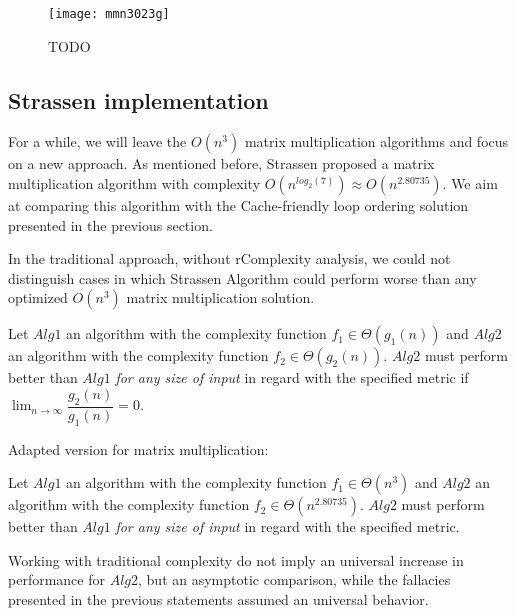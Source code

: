 \begin{table}[H]
\begin{tabular}
\end{tabular}
\caption{The regression model was evaluated using the above metrics: Root Mean Square Error (RMSE) and $R^2$ (coefficient of determination) regression score function. These high scores indicates that the regression line produces accurate estimations. }
\end{table}

\begin{figure}[H]
\centering
\texttt{[image: mmn3023g]}
\caption{TODO}
\end{figure}

\subsection{Strassen implementation}

For a while, we will leave the $O(n^3)$ matrix multiplication algorithms and focus on a new approach. As mentioned before, Strassen proposed a matrix multiplication algorithm with complexity $O(n^{log_{2}(7)}) \approx O(n^{2.80735})$. We aim at comparing this algorithm with the Cache-friendly loop ordering solution presented in the previous section. 

In the traditional approach, without rComplexity analysis, we could not distinguish cases in which Strassen Algorithm could perform worse than any optimized $O(n^3)$ matrix multiplication solution.


\begin{fallacy}
Let $Alg1$ an algorithm with the complexity function $f_{1} \in \Theta(g_1(n))$  and $Alg2$ an algorithm with the complexity function $f_{2} \in \Theta(g_2(n))$. $Alg2$ must perform better than $Alg1$ \textit{for any size of input} in regard with the specified metric if $\lim_{n\to\infty} \dfrac{g_2(n)}{g_1(n)} = 0$.
\end{fallacy}


\begin{fallacy}
Adapted version for matrix multiplication: 

Let $Alg1$ an algorithm with the complexity function $f_{1} \in \Theta(n^3)$  and $Alg2$ an algorithm with the complexity function $f_{2} \in \Theta(n^{2.80735})$. $Alg2$ must perform better than $Alg1$ \textit{for any size of input} in regard with the specified metric.
\end{fallacy}

Working with traditional complexity do not imply an universal increase in performance for $Alg2$, but an asymptotic comparison, while the fallacies presented in the previous statements assumed an universal behavior.


